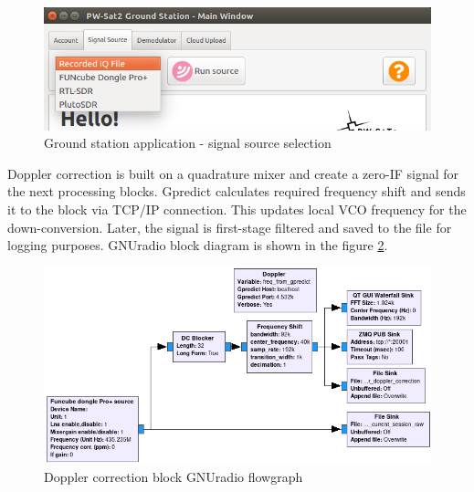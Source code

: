 \begin{figure}[H]
    \centering
    \includegraphics[width=0.6\paperwidth]{img/7/gs_source_selection.png}
    \caption{Ground station application - signal source selection}
    \label{gs_source_selection}
\end{figure}

Doppler correction is built on a quadrature mixer and create a zero-IF signal for the next processing blocks. Gpredict calculates required frequency shift and sends it to the block via TCP/IP connection. This updates local VCO frequency for the down-conversion. Later, the signal is first-stage filtered and saved to the file for logging purposes. GNUradio block diagram is shown in the figure \ref{gs_doppler_gnuradio}.

\begin{figure}[H]
    \centering
    \includegraphics[width=0.7\paperwidth]{img/7/gs_doppler_gnuradio.png}
    \caption{Doppler correction block GNUradio flowgraph}
    \label{gs_doppler_gnuradio}
\end{figure}

